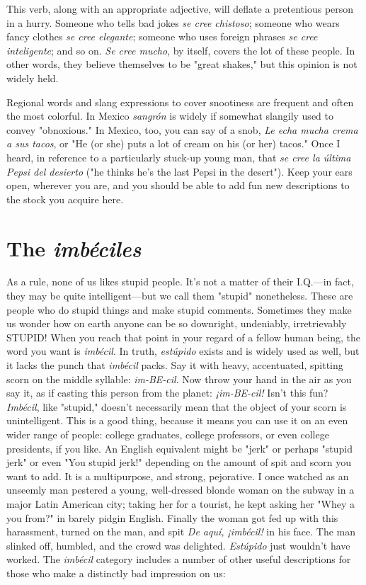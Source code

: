 \documentclass[14pt,a4paper,oneside]{memoir}
\newcommand{\bsk}{\vspace{20pt}}
\begin{document}
This verb, along with an appropriate adjective, will
deflate a pretentious person in a hurry. Someone who tells bad jokes
\emph{se cree chistoso}; someone who wears fancy clothes \emph{se cree elegante};
someone who uses foreign phrases \emph{se cree inteligente}; and so on. \emph{Se
cree mucho}, by itself, covers the lot of these people. In other words,
they believe themselves to be "great shakes," but this opinion is not
widely held.

\bsk

Regional words and slang expressions to cover snootiness are
frequent and often the most colorful. In Mexico \emph{sangrón} is widely if
somewhat slangily used to convey "obnoxious." In Mexico, too, you
can say of a snob, \emph{Le echa mucha crema a sus tacos}, or "He (or she)
puts a lot of cream on his (or her) tacos." Once I heard, in reference to
a particularly stuck-up young man, that \emph{se cree la última Pepsi del
desierto} ("he thinks he's the last Pepsi in the desert"). Keep your ears
open, wherever you are, and you should be able to add fun new descriptions to the stock you acquire here.

\section{The \emph{imbéciles}}

As a rule, none of us likes stupid people. It's not a matter of
their I.Q.---in fact, they may be quite intelligent---but we call them
"stupid" nonetheless. These are people who do stupid things and make
stupid comments. Sometimes they make us wonder how on earth anyone can be so downright, undeniably, irretrievably STUPID!
When you reach that point in your regard of a fellow human
being, the word you want is \emph{imbécil}. In truth, \emph{estúpido} exists and is
widely used as well, but it lacks the punch that \emph{imbécil} packs. Say it
with heavy, accentuated, spitting scorn on the middle syllable: \emph{im-BE-cil}. Now throw your hand in the air as you say it, as if casting this
person from the planet: \emph{¡im-BE-cil!} Isn't this fun?
\emph{Imbécil}, like "stupid," doesn't necessarily mean that the object of your scorn is unintelligent. This is a good thing, because it
means you can use it on an even wider range of people: college graduates, college professors, or even college presidents, if you like. An English equivalent might be "jerk" or perhaps "stupid jerk" or even "You
stupid jerk!" depending on the amount of spit and scorn you want to
add. It is a multipurpose, and strong, pejorative. I once watched as an
unseemly man pestered a young, well-dressed blonde woman on the
subway in a major Latin American city; taking her for a tourist, he
kept asking her "Whey a you from?" in barely pidgin English. Finally
the woman got fed up with this harassment, turned on the man, and
spit \emph{De aquí, ¡imbécil!} in his face. The man slinked off, humbled, and
the crowd was delighted. \emph{Estúpido} just wouldn't have worked.
The \emph{imbécil} category includes a number of other useful descriptions for those who make a distinctly bad impression on us:
\end{document}
